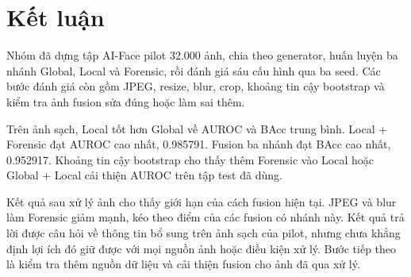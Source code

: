 \section{Kết luận}
Nhóm đã dựng tập AI-Face pilot 32.000 ảnh, chia theo generator, huấn luyện ba nhánh Global, Local và Forensic, rồi đánh giá sáu cấu hình qua ba seed. Các bước đánh giá còn gồm JPEG, resize, blur, crop, khoảng tin cậy bootstrap và kiểm tra ảnh fusion sửa đúng hoặc làm sai thêm.

Trên ảnh sạch, Local tốt hơn Global về AUROC và BAcc trung bình. Local + Forensic đạt AUROC cao nhất, 0.985791. Fusion ba nhánh đạt BAcc cao nhất, 0.952917. Khoảng tin cậy bootstrap cho thấy thêm Forensic vào Local hoặc Global + Local cải thiện AUROC trên tập test đã dùng.

Kết quả sau xử lý ảnh cho thấy giới hạn của cách fusion hiện tại. JPEG và blur làm Forensic giảm mạnh, kéo theo điểm của các fusion có nhánh này. Kết quả trả lời được câu hỏi về thông tin bổ sung trên ảnh sạch của pilot, nhưng chưa khẳng định lợi ích đó giữ được với mọi nguồn ảnh hoặc điều kiện xử lý. Bước tiếp theo là kiểm tra thêm nguồn dữ liệu và cải thiện fusion cho ảnh đã qua xử lý.
